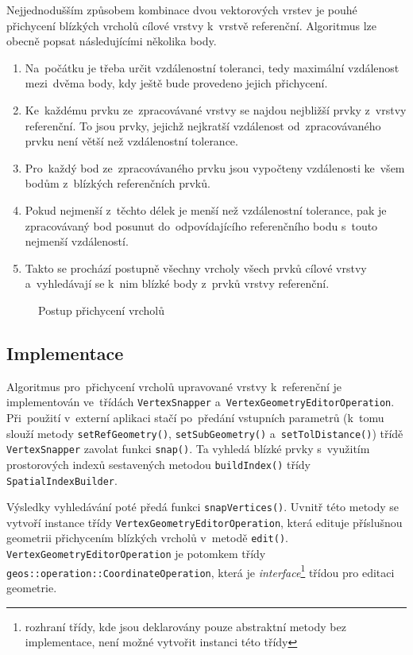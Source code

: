 Nejjednodušším způsobem kombinace dvou vektorových vrstev je pouhé přichycení 
blízkých vrcholů cílové vrstvy k~vrstvě referenční. Algoritmus lze obecně 
popsat následujícími několika body.

\begin{enumerate}
 \item Na~počátku je třeba určit vzdálenostní toleranci, tedy maximální 
    vzdálenost mezi~dvěma body, kdy ještě bude provedeno jejich přichycení.
 \item Ke~každému prvku ze~zpracovávané vrstvy se najdou nejbližší prvky 
    z~vrstvy referenční. To jsou prvky, jejichž nejkratší vzdálenost 
    od~zpracovávaného prvku není větší	než vzdálenostní tolerance.
 \item Pro~každý bod ze~zpracovávaného prvku jsou vypočteny vzdálenosti 
    ke~všem bodům z~blízkých referenčních prvků.
 \item Pokud nejmenší z~těchto délek je menší než vzdálenostní tolerance, 
    pak je zpracovávaný bod posunut do~odpovídajícího referenčního bodu 
    s~touto nejmenší vzdáleností.
 \item Takto se prochází postupně všechny vrcholy všech prvků cílové vrstvy 
    a~vyhledávají se k~nim blízké body z~prvků vrstvy referenční. 
\end{enumerate}

\label{vspic}
  \begin{figure}[h!]
    \centering
      
      \caption{Postup přichycení vrcholů}
      \label{fig:vs-princip}
  \end{figure}


\subsection{Implementace}
\label{vs-implementace}
Algoritmus pro~přichycení vrcholů upravované vrstvy k~referenční 
je implementován ve~třídách \texttt{Vertex\-Snapper} 
a~\texttt{Vertex\-Geometry\-Editor\-Operation}. Při~použití v~externí 
aplikaci stačí po~předání vstupních parametrů (k~tomu slouží metody 
\texttt{setRefGeometry()}, \texttt{setSubGeometry()} 
a~\texttt{setTolDistance()}) třídě \texttt{Vertex\-Snapper} zavolat 
funkci \texttt{snap()}. Ta vyhledá blízké prvky s~využitím prostorových 
indexů sesta\-vených metodou \texttt{build\-Index()} třídy 
\texttt{Spatial\-Index\-Builder}.

Výsledky vyhledávání poté předá funkci \texttt{snap\-Vertices()}. 
Uvnitř této metody se vytvoří instance  třídy 
\texttt{Vertex\-Geometry\-Editor\-Operation}, která edituje příslušnou 
geometrii přichycením blízkých vrcholů v~metodě \texttt{edit()}. 
\texttt{Vertex\-Geometry\-Editor\-Operation} je potomkem třídy 
\texttt{geos::\-operation::\-Coordinate\-Operation}, která je 
\textit{inter\-face}\footnote{rozhraní třídy, kde jsou deklarovány 
pouze abstraktní metody bez implementace, není možné vytvořit 
instanci této třídy} třídou pro editaci geometrie.

